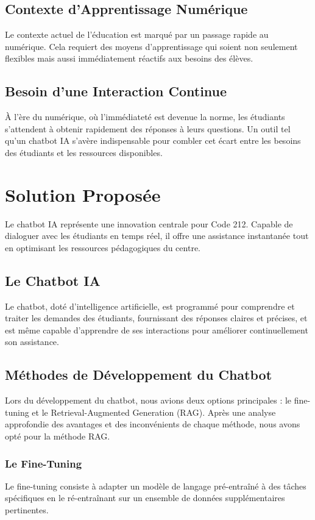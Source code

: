 \documentclass[a4paper, 11pt, openany]{report}
\begin{document}
\subsection{Contexte d'Apprentissage Numérique}
Le contexte actuel de l'éducation est marqué par un passage rapide au numérique. Cela requiert des moyens d'apprentissage qui soient non seulement flexibles mais aussi immédiatement réactifs aux besoins des élèves.

\subsection{Besoin d'une Interaction Continue}
À l'ère du numérique, où l'immédiateté est devenue la norme, les étudiants s'attendent à obtenir rapidement des réponses à leurs questions. Un outil tel qu'un chatbot IA s'avère indispensable pour combler cet écart entre les besoins des étudiants et les ressources disponibles.

\section{Solution Proposée}
Le chatbot IA représente une innovation centrale pour Code 212. Capable de dialoguer avec les étudiants en temps réel, il offre une assistance instantanée tout en optimisant les ressources pédagogiques du centre.

\subsection{Le Chatbot IA}
Le chatbot, doté d'intelligence artificielle, est programmé pour comprendre et traiter les demandes des étudiants, fournissant des réponses claires et précises, et est même capable d'apprendre de ses interactions pour améliorer continuellement son assistance.

\subsection{Méthodes de Développement du Chatbot}
Lors du développement du chatbot, nous avions deux options principales : le fine-tuning et le Retrieval-Augmented Generation (RAG). Après une analyse approfondie des avantages et des inconvénients de chaque méthode, nous avons opté pour la méthode RAG.

\subsubsection{Le Fine-Tuning}
Le fine-tuning consiste à adapter un modèle de langage pré-entraîné à des tâches spécifiques en le ré-entraînant sur un ensemble de données supplémentaires pertinentes.
\end{document}
